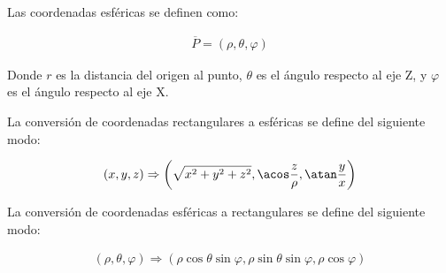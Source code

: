 Las coordenadas esféricas se definen como:

\begin{eqnarray*}
  \overline{P} = \left(\rho,\theta,\varphi\right)
\end{eqnarray*}

Donde ${r}$ es la distancia del origen al punto, ${\theta}$ es el ángulo respecto al eje Z, y ${\varphi}$ es el ángulo respecto al eje X.

La conversión de coordenadas rectangulares a esféricas se define del siguiente modo:

\begin{eqnarray*}
  \left(x,y,z\right) \Rightarrow \left(\sqrt{x^2+y^2+z^2},\acos\frac{z}{\rho},\atan\frac{y}{x}\right)
\end{eqnarray*}

La conversión de coordenadas esféricas a rectangulares se define del siguiente modo:

\begin{eqnarray*}
  \left(\rho,\theta,\varphi\right) \Rightarrow \left(\rho\cos\theta\sin\varphi,\rho\sin\theta\sin\varphi,\rho\cos\varphi\right)
\end{eqnarray*}
